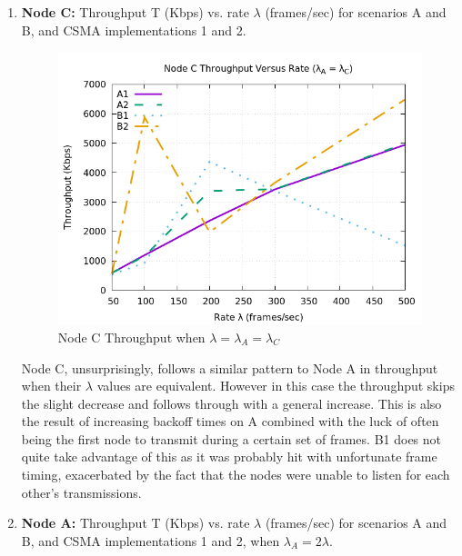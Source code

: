 \documentclass[12pt]{article}
\begin{document}
\begin{enumerate}
        \item { %
            {\bf Node C:} Throughput T (Kbps) vs. rate \(\lambda{}\) (frames/sec) for scenarios A and B, and CSMA implementations 1 and 2.
            
            \begin{figure}[!htb]
                \centering
                \includegraphics[width=5in]{1B.png}
                \caption{Node C Throughput when \(\lambda{} = \lambda{}_A = \lambda{}_C\) }
                \label{fig:1B}
            \end{figure}

            Node C, unsurprisingly, follows a similar pattern to Node A in throughput when their \(\lambda{}\) values are equivalent. However in this case the throughput skips the slight decrease and follows through with a general increase. This is also the result of increasing backoff times on A combined with the luck of often being the first node to transmit during a certain set of frames. B1 does not quite take advantage of this as it was probably hit with unfortunate frame timing, exacerbated by the fact that the nodes were unable to listen for each other's transmissions.
        }
        
\clearpage
        \item { %
            {\bf Node A:} Throughput T (Kbps) vs. rate \(\lambda{}\) (frames/sec) for scenarios A and B, and CSMA implementations 1 and 2, when \(\lambda{}_A = 2\lambda{}\).
            
}
\end{enumerate}
\end{document}
